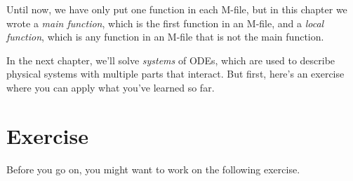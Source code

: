 Until now, we have only put one function in each M-file, but in this chapter we wrote a \emph{main function}, which is the first function in an M-file, and a \emph{local function}, which is any function in an M-file that is not the main function.

In the next chapter, we'll solve \emph{systems} of ODEs, which are used to describe physical systems with multiple parts that interact.
But first, here's an exercise where you can apply what you've learned so far.


\section{Exercise}

Before you go on, you might want to work on the following exercise.

